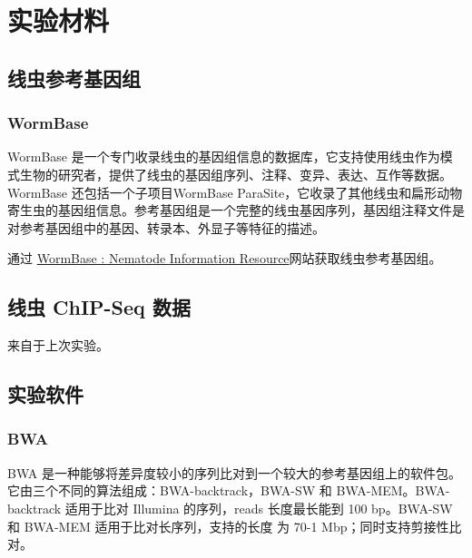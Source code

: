 \documentclass{ctexart}
\begin{document}
    

    \clearpage
    \quad
    \thispagestyle{empty}
    \clearpage

    \tableofcontents
    
    

    \thispagestyle{empty}

    \clearpage
    \quad
    \thispagestyle{empty}
    \clearpage

    \setcounter{page}{1}

    \section{实验材料}

    \subsection{线虫参考基因组}
    
    \subsubsection{WormBase}

    WormBase 是一个专门收录线虫的基因组信息的数据库，它支持使用线虫作为模式生物的研究者，提供了线虫的基因组序列、注释、变异、表达、互作等数据。WormBase 还包括一个子项目WormBase ParaSite，它收录了其他线虫和扁形动物寄生虫的基因组信息。参考基因组是一个完整的线虫基因序列，基因组注释文件是对参考基因组中的基因、转录本、外显子等特征的描述。

    通过 \href{https://wormbase.org/}{WormBase : Nematode Information Resource}网站获取线虫参考基因组。

    \subsection{线虫 ChIP-Seq 数据}

    来自于上次实验。

    \subsection{实验软件}

    \subsubsection{BWA}

    BWA 是一种能够将差异度较小的序列比对到一个较大的参考基因组上的软件包。它由三个不同的算法组成：BWA-backtrack，BWA-SW 和 BWA-MEM。BWA-backtrack 适用于比对 Illumina 的序列，reads 长度最长能到 100 bp。BWA-SW 和 BWA-MEM 适用于比对长序列，支持的长度
    为 70-1 Mbp；同时支持剪接性比对。
\end{document}
